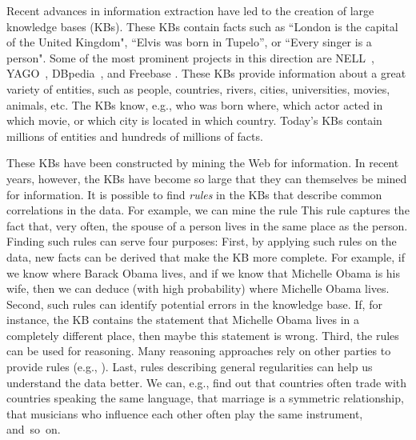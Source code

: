Recent advances in information extraction have led to the creation of large knowledge bases (KBs).
These KBs contain facts such as
 ``London is the capital of the United Kingdom", ``Elvis was born in Tupelo'', or ``Every singer is a person".
Some of the most prominent projects in this direction are NELL~\cite{carlson-aaai}, YAGO~\cite{SucKasWei07}, DBpedia~\cite{dbpedia}, and Freebase \cite{freebase}. %
These KBs provide information about a great variety of entities, such as people, countries, rivers, cities, universities, movies, animals, etc.
The KBs know, e.g., who was born where, which actor acted in which movie, or which city is located in which country. Today's KBs contain millions of entities and hundreds of millions of facts.

These KBs have been constructed by mining the Web for information.
In recent years, however, the KBs have become so large that they can themselves be mined for information.
It is possible to find \emph{rules} in the KBs that describe common correlations in the data. For example, we can mine the rule
This rule captures the fact that, very often, the spouse of a person lives in the same place as the person.
Finding such rules can serve four purposes: First, by applying such rules on the data, new facts can be derived that make the KB more complete.
For example, if we know where Barack Obama lives, and if we know that Michelle Obama is his wife, then we can deduce (with high probability) where Michelle Obama lives.
Second, such rules can identify potential errors in the knowledge base. If, for instance, the KB contains the statement that Michelle Obama lives in a completely different place, then maybe this statement is wrong.
Third, the rules can be used for reasoning. Many reasoning approaches rely on other parties to provide rules (e.g., \cite{markovlogic,urdf}).
Last, rules describing general regularities can help us understand the data better.
We can, e.g., find out that countries often trade with countries speaking the same language, that marriage is a symmetric relationship, that musicians who influence each other often play the same instrument, and~so~on.

